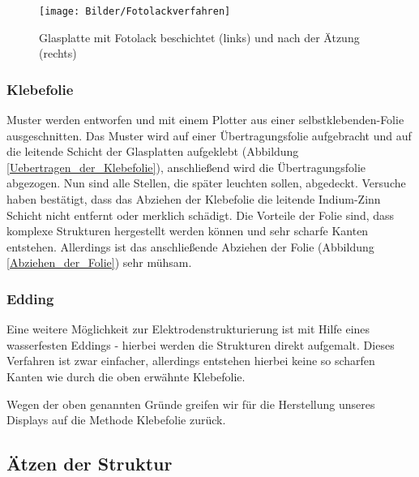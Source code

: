 \begin{figure}[t]
  \centering
  \texttt{[image: Bilder/Fotolackverfahren]}
  \caption{Glasplatte mit Fotolack beschichtet (links) und nach der Ätzung (rechts)}
  \label{Fotolackverfahren}
\end{figure}



\subsubsection*{Klebefolie}\label{subsec:klebefolie}
Muster werden entworfen und mit einem Plotter aus einer selbstklebenden-Folie ausgeschnitten. Das Muster wird auf einer Übertragungsfolie aufgebracht und auf die leitende Schicht der Glasplatten aufgeklebt (Abbildung \ref{Uebertragen_der_Klebefolie}), anschließend wird die Übertragungsfolie abgezogen. Nun sind alle Stellen, die später leuchten sollen, abgedeckt. Versuche haben bestätigt, dass das Abziehen der Klebefolie die leitende Indium-Zinn Schicht nicht entfernt oder merklich schädigt. Die Vorteile der Folie sind, dass komplexe Strukturen hergestellt werden können und sehr scharfe Kanten entstehen. Allerdings ist das anschließende Abziehen der Folie (Abbildung \ref{Abziehen_der_Folie}) sehr mühsam.


\subsubsection*{Edding}
Eine weitere Möglichkeit zur Elektrodenstrukturierung ist mit Hilfe eines wasserfesten Eddings - hierbei werden die Strukturen direkt aufgemalt. Dieses Verfahren ist zwar einfacher, allerdings entstehen hierbei keine so scharfen Kanten wie durch die oben erwähnte Klebefolie.

Wegen der oben genannten Gründe greifen wir für die Herstellung unseres Displays auf die Methode Klebefolie zurück.


\subsection{Ätzen der Struktur}

